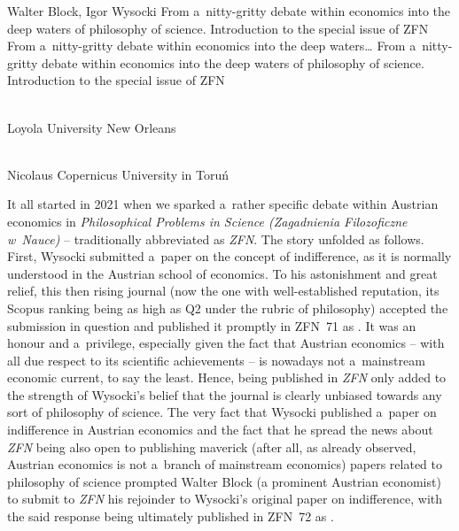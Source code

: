 \begin{editorialeng2auth}{Walter Block, Igor Wysocki}
	{From a~nitty-gritty debate within economics into the deep waters of philosophy of science.
	Introduction to the special issue of ZFN}
	{From a~nitty-gritty debate within economics into the deep waters\ldots}
	{From a~nitty-gritty debate within economics into the deep waters of philosophy of science.
	Introduction to the special issue of ZFN}
	{%
			{\flushright{}\\\subsubsectit\small{Loyola University New Orleans}\par}%
			{\flushright{}\\\subsubsectit\small{Nicolaus Copernicus University in Toruń}\par}%
	}









It all started in 2021 when we sparked a~rather specific debate within Austrian economics in \textit{Philosophical Problems in Science (Zagadnienia Filozoficzne w~Nauce)} – traditionally abbreviated as \textit{ZFN}. The story unfolded as follows. First, Wysocki submitted a~paper on the concept of indifference, as it is normally understood in the Austrian school of economics. To his astonishment and great relief, this then rising journal (now the one with well-established reputation, its Scopus ranking being as high as Q2 under the rubric of philosophy) accepted the submission in question and published it promptly in ZFN~71
as 
\parencite[][]{wysocki_problem_2021}. %
 It was an honour and a~privilege, especially given the fact that Austrian economics -- with all due respect to its scientific achievements -- is nowadays not a~mainstream economic current, to say the least. Hence, being published in \textit{ZFN} only added to the strength of Wysocki's belief that the journal is clearly unbiased towards any sort of philosophy of science. The very fact that Wysocki published a~paper on indifference in Austrian economics and the fact that he spread the news about \textit{ZFN} being also open to publishing maverick (after all, as already observed, Austrian economics is not a~branch of mainstream economics) papers related to philosophy of science prompted Walter Block (a prominent Austrian economist) to submit to \textit{ZFN} his rejoinder to Wysocki's original paper on indifference, with the said response being ultimately published in ZFN~72
 as 
\parencite[][]{block_response_2022}.%





\end{editorialeng2auth}
